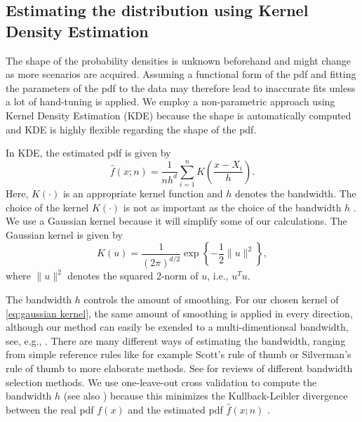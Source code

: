 \subsection{Estimating the distribution using Kernel Density Estimation}
\label{sec:kde}

The shape of the probability densities is unknown beforehand and might change as more scenarios are acquired. Assuming a functional form of the pdf and fitting the parameters of the pdf to the data may therefore lead to inaccurate fits unless a lot of hand-tuning is applied. We employ a non-parametric approach using Kernel Density Estimation (KDE) \cite{rosenblatt1956remarks, parzen1962estimation} because the shape is automatically computed and KDE is highly flexible regarding the shape of the pdf.

In KDE, the estimated pdf is given by
\begin{equation}
	\label{eq:kde}
	\hat{f}(x;n) = \frac{1}{nh^d} \sum_{i=1}^n K\left(\frac{x - X_i}{h}\right).
\end{equation}
Here, $K(\cdot)$ is an appropriate kernel function and $h$ denotes the bandwidth. The choice of the kernel $K(\cdot)$ is not as important as the choice of the bandwidth $h$ \cite{turlach1993bandwidthselection}. We use a Gaussian kernel because it will simplify some of our calculations. The Gaussian kernel is given by
\begin{equation}
	\label{eq:gaussian kernel}
	K(u) = \frac{1}{\left( 2\pi \right)^{d/2}} \exp \left\{ -\frac{1}{2} \|u\|^2 \right\},
\end{equation}
where $\|u\|^2$ denotes the squared 2-norm of $u$, i.e., $u^T u$.

The bandwidth $h$ controls the amount of smoothing. For our chosen kernel of \cref{eq:gaussian kernel}, the same amount of smoothing is applied in every direction, although our method can easily be exended to a multi-dimentionsal bandwidth, see, e.g., \textcite{chen2017tutorial}. There are many different ways of estimating the bandwidth, ranging from simple reference rules like for example Scott's rule of thumb \cite{scott1992multivariate} or Silverman's rule of thumb \cite{silverman1986density} to more elaborate methods. See \textcite{turlach1993bandwidthselection, bashtannyk2001bandwidth, jones1996brief, chiu1996comparative} for reviews of different bandwidth selection methods. We use one-leave-out cross validation to compute the bandwidth $h$ (see also \textcite{duin1976parzen}) because this minimizes the Kullback-Leibler divergence between the real pdf $f(x)$ and the estimated pdf $\hat{f}(x;n)$ \cite{turlach1993bandwidthselection,zambom2013review}.

